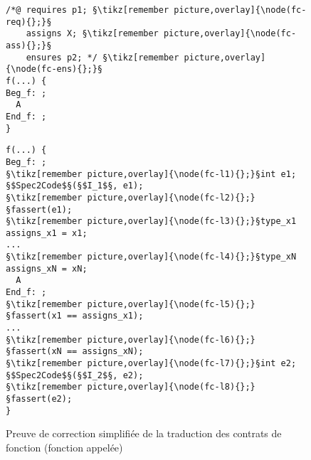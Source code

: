 \begin{figure}[bt]
  \begin{minipage}{0.65\textwidth}
    \begin{lstlisting}[escapechar=§]
/*@ requires p1; §\tikz[remember picture,overlay]{\node(fc-req){};}§
    assigns X; §\tikz[remember picture,overlay]{\node(fc-ass){};}§
    ensures p2; */ §\tikz[remember picture,overlay]{\node(fc-ens){};}§
f(...) {
Beg_f: ;
  A
End_f: ;
}
    \end{lstlisting}
  \end{minipage}\hfill
  \begin{minipage}{0.49\textwidth}
    \begin{lstlisting}[escapechar=§]
f(...) {
Beg_f: ;
§\tikz[remember picture,overlay]{\node(fc-l1){};}§int e1; §$Spec2Code$§(§$I_1$§, e1);
§\tikz[remember picture,overlay]{\node(fc-l2){};}§fassert(e1);
§\tikz[remember picture,overlay]{\node(fc-l3){};}§type_x1 assigns_x1 = x1;
...
§\tikz[remember picture,overlay]{\node(fc-l4){};}§type_xN assigns_xN = xN;
  A
End_f: ;
§\tikz[remember picture,overlay]{\node(fc-l5){};}§fassert(x1 == assigns_x1);
...
§\tikz[remember picture,overlay]{\node(fc-l6){};}§fassert(xN == assigns_xN);
§\tikz[remember picture,overlay]{\node(fc-l7){};}§int e2; §$Spec2Code$§(§$I_2$§, e2);
§\tikz[remember picture,overlay]{\node(fc-l8){};}§fassert(e2);
}
    \end{lstlisting}
  \end{minipage}
  \caption{Preuve de correction simplifiée de la traduction des contrats de
    fonction (fonction appelée)}
  \label{fig:proof-fct-contract-call}
\end{figure}
